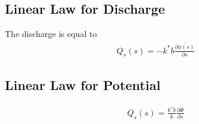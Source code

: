 \documentclass[11pt]{article}
\begin{document}
\subsection{Linear Law for Discharge}
The discharge is equal to 
\begin{align}
Q_{s}(s) = - k^{*}b\frac{\partial \tilde{\phi(s)}}{\partial s}
\end{align}

\subsection{Linear Law for Potential}
\begin{align}
Q_{s}(s) = \frac{k^{*}b}{k}\frac{\partial \Phi}{\partial s}
\end{align}

\end{document}
